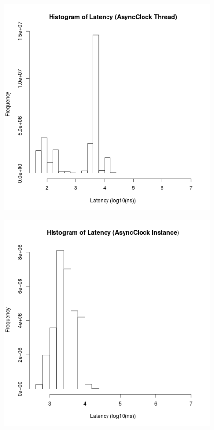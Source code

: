 \begin{figure}
\center
\includegraphics[height=.4\textheight]{async_thread_latency_hist.png}
\caption{\label{async_thread_latency}}
\end{figure}

\begin{figure}
\center
\includegraphics[height=.4\textheight]{async_instance_latency_hist.png}
\caption{\label{async_instance_latency}}
\end{figure}

